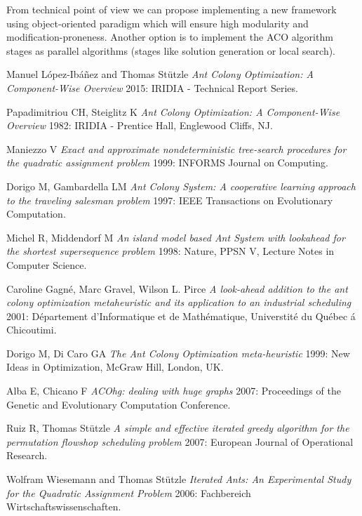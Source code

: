 \documentclass[12pt]{article}
\begin{document}
From technical point of view we can propose implementing a new framework using object-oriented paradigm which will ensure high modularity and modification-proneness. Another option is to implement the ACO algorithm stages as parallel algorithms (stages like solution generation or local search). 




\begin{thebibliography}{1}

 Manuel L{\'o}pez-Ib{\'a}{\~n}ez and Thomas St{\"u}tzle {\em Ant Colony Optimization: A Component-Wise Overview} 2015: IRIDIA - Technical Report Series.

 Papadimitriou CH, Steiglitz K {\em Ant Colony Optimization: A Component-Wise Overview} 1982: IRIDIA - Prentice Hall, Englewood Cliffs, NJ.

 Maniezzo V {\em Exact and approximate nondeterministic tree-search procedures for the quadratic assignment problem} 1999: INFORMS Journal on Computing.

 Dorigo M, Gambardella LM {\em Ant Colony System: A cooperative learning
approach to the traveling salesman problem} 1997: IEEE Transactions on Evolutionary
Computation.

 Michel R, Middendorf M {\em An island model based Ant System with
lookahead for the shortest supersequence problem} 1998: Nature, PPSN V, Lecture Notes in Computer Science.

 Caroline Gagn{\'e}, Marc Gravel, Wilson L. Pirce {\em  A look-ahead addition to the ant colony optimization metaheuristic and its application to an industrial scheduling} 2001: D{\'e}partement d'Informatique et de Math{\'e}matique, Universtit{\'e} du Qu{\'e}bec {\'a} Chicoutimi.

 Dorigo M, Di Caro GA {\em The Ant Colony Optimization meta-heuristic} 1999: New Ideas in Optimization, McGraw Hill, London, UK.

 Alba E, Chicano F {\em ACOhg: dealing with huge graphs} 2007: Proceedings of the Genetic and Evolutionary Computation Conference.

 Ruiz R, Thomas St{\"u}tzle {\em A simple and effective iterated greedy algorithm for the permutation flowshop scheduling problem} 2007: European Journal of Operational Research.

 Wolfram Wiesemann and Thomas St{\"u}tzle {\em Iterated Ants: An Experimental Study for the Quadratic Assignment Problem} 2006: Fachbereich Wirtschaftswissenschaften.


\end{thebibliography}
\end{document}
